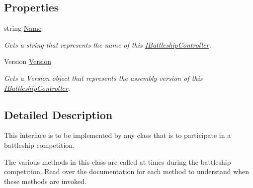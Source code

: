 \subsection*{Properties}
\begin{DoxyCompactItemize}
\item 
\hypertarget{interface_m_b_c_1_1_core_1_1_i_battleship_controller_a6a6130592110828d325bc93e1d55586d}{string \hyperlink{interface_m_b_c_1_1_core_1_1_i_battleship_controller_a6a6130592110828d325bc93e1d55586d}{Name}}\label{interface_m_b_c_1_1_core_1_1_i_battleship_controller_a6a6130592110828d325bc93e1d55586d}

\begin{DoxyCompactList}\small\item\em Gets a string that represents the name of this \hyperlink{interface_m_b_c_1_1_core_1_1_i_battleship_controller}{I\-Battleship\-Controller}.\end{DoxyCompactList}\item 
\hypertarget{interface_m_b_c_1_1_core_1_1_i_battleship_controller_a526e01cd2a35e521f0965b3fbb1b4cd4}{Version \hyperlink{interface_m_b_c_1_1_core_1_1_i_battleship_controller_a526e01cd2a35e521f0965b3fbb1b4cd4}{Version}}\label{interface_m_b_c_1_1_core_1_1_i_battleship_controller_a526e01cd2a35e521f0965b3fbb1b4cd4}

\begin{DoxyCompactList}\small\item\em Gets a Version object that represents the assembly version of this \hyperlink{interface_m_b_c_1_1_core_1_1_i_battleship_controller}{I\-Battleship\-Controller}.\end{DoxyCompactList}\end{DoxyCompactItemize}


\subsection{Detailed Description}
This interface is to be implemented by any class that is to participate in a battleship competition. 

The various methods in this class are called at times during the battleship competition. Read over the documentation for each method to understand when these methods are invoked. 

